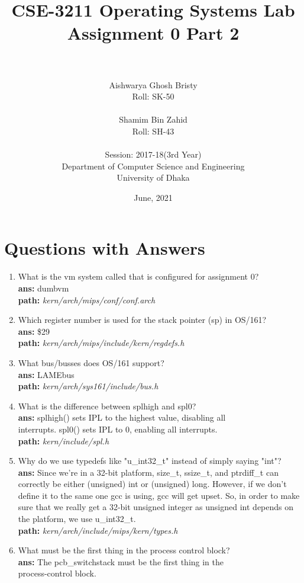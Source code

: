 \documentclass[14pt, a4paper]{article}
\title{\textbf{CSE-3211 Operating Systems Lab\\Assignment 0 Part 2}}
\author{\\\\Aishwarya Ghosh Bristy\\
        Roll: SK-50\\\\
        
        Shamim Bin Zahid\\
        Roll: SH-43\\\\
        
        Session: 2017-18(3rd Year)\\
        Department of Computer Science and Engineering\\
        University of Dhaka}
\date{June, 2021}
\begin{document}
\maketitle
\newpage

\section{Questions with Answers}

\begin{enumerate}
    \item What is the vm system called that is configured for assignment 0?\\
          \textbf{ans: } dumbvm\\
          \textbf{path:} \emph{kern/arch/mips/conf/conf.arch}
    \item Which register number is used for the stack pointer (sp) in OS/161?\\
          \textbf{ans: } \$29\\
          \textbf{path:} \emph{ kern/arch/mips/include/kern/regdefs.h}
    \item What bus/busses does OS/161 support?\\
          \textbf{ans: } LAMEbus\\
          \textbf{path:} \emph{kern/arch/sys161/include/bus.h}
    \item What is the difference between splhigh and spl0?\\
          \textbf{ans: } splhigh() sets IPL to the highest value, disabling all\\
          interrupts. spl0() sets IPL to 0, enabling all interrupts.\\
          \textbf{path:} \emph{ kern/include/spl.h}
     \item Why do we use typedefs like "u\_int32\_t" instead of simply saying "int"?\\
        \textbf{ans: } Since we’re in a 32-bit platform, size\_t, ssize\_t, and ptrdiff\_t can correctly be either (unsigned) int or (unsigned) long. However, if we don’t define it to the same one gcc is using, gcc will get upset. So, in order to make sure that we really get a 32-bit unsigned integer as unsigned int depends on the platform, we use u\_int32\_t.\\
        \textbf{path:} \emph{kern/arch/include/mips/kern/types.h}
    \item What must be the first thing in the process control block?\\
          \textbf{ans: } The pcb\_switchstack must be the first thing in the\\ process-control block.\\

\end{enumerate}
\end{document}
